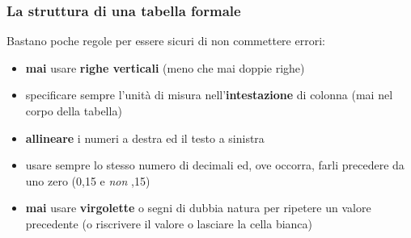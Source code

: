\documentclass[svgnames,%
	ucs,%
	pdftex]{guitbeamer}
\begin{document}
\begin{frame}
  \frametitle{La struttura di una tabella formale}
	Bastano poche regole per essere sicuri di non commettere errori:
  \medskip
	\begin{itemize}
		\item \textbf{mai} usare \textbf{righe verticali} (meno che mai	doppie righe)
		\item specificare sempre l'unit\`a  di misura nell'\textbf{intestazione} di colonna (mai nel corpo della tabella)
		\item \textbf{allineare} i numeri a destra ed il testo a sinistra 
		\item usare sempre lo stesso numero di decimali ed, ove occorra, farli precedere da uno zero (0,15 e \emph{non} ,15)
		\item \textbf{mai} usare \textbf{virgolette} o segni di dubbia natura per ripetere un valore precedente (o riscrivere il valore o lasciare la cella bianca)
	\end{itemize}
\end{frame}
\end{document}
